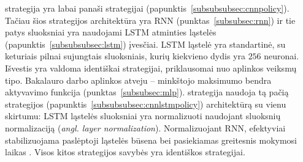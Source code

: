 \documentclass{VUMIFPSbakalaurinis}
\begin{document}
\label{subsubsubsec:cnnlstmpolicy}
{
	 strategija yra labai panaši  strategijai (papunktis~\ref{subsubsubsec:cnnpolicy}). Tačiau šios strategijos architektūra yra RNN (punktas~\ref{subsubsec:rnn}) ir tie patys  sluoksniai yra naudojami LSTM atminties ląstelės (papunktis~\ref{subsubsubsec:lstm}) įvesčiai. LSTM ląstelė yra standartinė, su keturiais pilnai sujungtais sluoksniais, kurių kiekvieno dydis yra \(256\) neuronai. Išvestis yra valdoma identiškai  strategijai, priklausomai nuo aplinkos veiksmų tipo. Bakalauro darbo aplinkos atveju -- minkštojo maksimumo bendra aktyvavimo funkcija (punktas~\ref{subsubsec:mlp}). 
}
\label{subsubsubsec:cnnlnlstmpolicy}
{
	 strategija naudoja tą pačią  strategijos (papunktis~\ref{subsubsubsec:cnnlstmpolicy}) architektūrą su vienu skirtumu: LSTM ląstelės sluoksniai yra normalizuoti naudojant sluoksnių normalizaciją (\textit{angl. layer normalization}). Normalizuojant RNN, efektyviai stabilizuojama paslėptoji ląstelės būsena bei pasiekiamas greitesnis mokymosi laikas \cite{ba2016layer}. Visos kitos strategijos savybės yra identiškos  strategijai.
}
\end{document}
